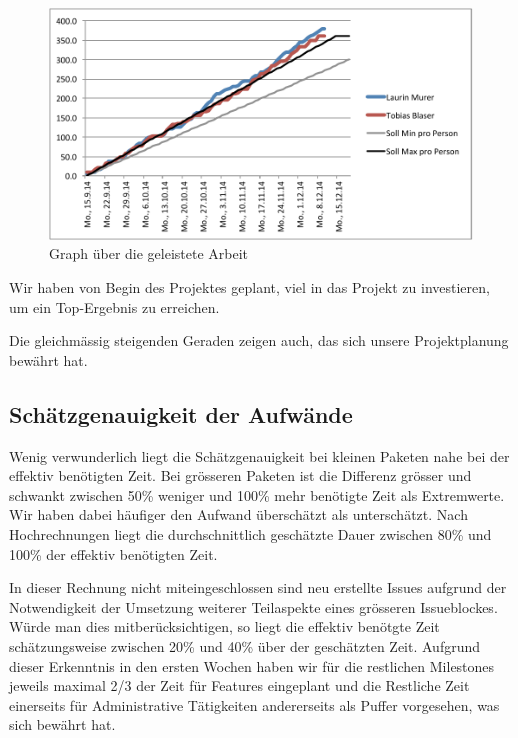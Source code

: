 	\begin{figure}[H]
		\includegraphics[width=\textwidth]{projectPlan/media/img/workGraph.pdf}
		\centering
		\caption{Graph über die geleistete Arbeit}
		\label{fig:workGraph}
	\end{figure}
	
	Wir haben von Begin des Projektes geplant, viel in das Projekt zu investieren, um ein Top-Ergebnis zu erreichen.
	
	Die gleichmässig steigenden Geraden zeigen auch,
	das sich unsere Projektplanung bewährt hat.


	\subsection{Schätzgenauigkeit der Aufwände}
	Wenig verwunderlich liegt die Schätzgenauigkeit bei kleinen Paketen nahe bei der effektiv benötigten Zeit.
	Bei grösseren Paketen ist die Differenz grösser und schwankt zwischen 50\% weniger und 100\% mehr benötigte Zeit als Extremwerte.
	Wir haben dabei häufiger den Aufwand überschätzt als unterschätzt.
	Nach Hochrechnungen liegt die durchschnittlich geschätzte Dauer zwischen 80\% und 100\% der effektiv benötigten Zeit.
	
	In dieser Rechnung nicht miteingeschlossen sind neu erstellte Issues aufgrund der Notwendigkeit der Umsetzung weiterer Teilaspekte eines grösseren Issueblockes.
	Würde man dies mitberücksichtigen, so liegt die effektiv benötgte Zeit schätzungsweise zwischen 20\% und 40\% über der geschätzten Zeit.
	Aufgrund dieser Erkenntnis in den ersten Wochen haben wir für die restlichen Milestones jeweils maximal 2/3 der Zeit für Features eingeplant und die Restliche Zeit einerseits für Administrative Tätigkeiten andererseits als Puffer vorgesehen, was sich bewährt hat. 
